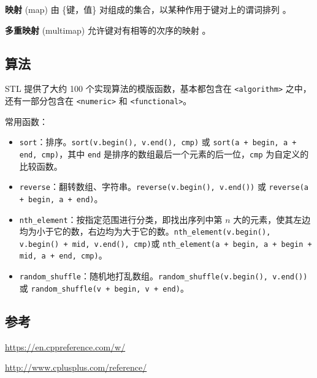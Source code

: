 \textbf{映射} (map) 由 \{键，值\} 对组成的集合，以某种作用于键对上的谓词排列 。

\textbf{多重映射} (multimap) 允许键对有相等的次序的映射 。

\subsection{算法}

STL 提供了大约 100 个实现算法的模版函数，基本都包含在 \texttt{<algorithm>} 之中，还有一部分包含在 \texttt{<numeric>} 和 \texttt{<functional>}。

常用函数：

\begin{itemize}
\item \texttt{sort}：排序。\texttt{sort(v.begin(), v.end(), cmp)} 或 \texttt{sort(a + begin, a + end, cmp)}，其中 \texttt{end} 是排序的数组最后一个元素的后一位，\texttt{cmp} 为自定义的比较函数。
\item \texttt{reverse}：翻转数组、字符串。\texttt{reverse(v.begin(), v.end())} 或 \texttt{reverse(a + begin, a + end)}。
\item \texttt{nth\_element}：按指定范围进行分类，即找出序列中第 $n$ 大的元素，使其左边均为小于它的数，右边均为大于它的数。\texttt{nth\_element(v.begin(), v.begin() + mid, v.end(), cmp)}或 \texttt{nth\_element(a + begin, a + begin + mid, a + end, cmp)}。
\item \texttt{random\_shuffle}：随机地打乱数组。\texttt{random\_shuffle(v.begin(), v.end())} 或 \texttt{random\_shuffle(v + begin, v + end)}。
\end{itemize}

\subsection{参考}

\url{https://en.cppreference.com/w/}

\url{http://www.cplusplus.com/reference/}
